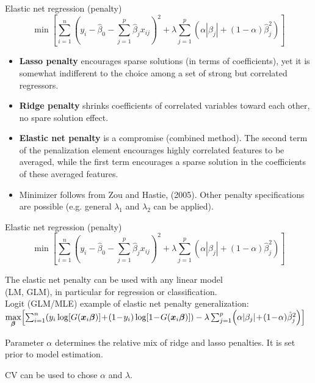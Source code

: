 \documentclass{beamer}
\begin{document}
\begin{frame}{Elastic net regression (penalty)}
$$\min \left[ \sum_{i=1}^n \left(y_i - \hat{\beta}_0 
         - \sum_{j=1}^p  \hat{\beta}_j x_{ij} \right)^2 
         \! + \lambda \sum_{j=1}^p 
         \left( \alpha |\beta_j| + (1-\alpha) \hat{\beta}_j^2 \right) \right]
$$
\small
\begin{itemize}
\item \textbf{Lasso penalty} encourages sparse solutions (in terms of coefficients), yet it is somewhat indifferent to the choice among a set of strong but correlated regressors.
\smallskip
\item \textbf{Ridge penalty} shrinks coefficients of correlated variables toward each other, no spare solution effect.
\smallskip
\item \textbf{Elastic net penalty} is a compromise (combined method). The second term of the penalization element encourages highly correlated features to be averaged, while
the first term encourages a sparse solution in the coefficients of these averaged features.
\item Minimizer follows from Zou and Hastie, (2005). Other penalty specifications are possible (e.g. general $\lambda_1$ and $\lambda_2$ can be applied).
\end{itemize}
\end{frame}
\begin{frame}{Elastic net regression (penalty)}
$$\min \left[ \sum_{i=1}^n \left(y_i - \hat{\beta}_0 
         - \sum_{j=1}^p  \hat{\beta}_j x_{ij} \right)^2 
         \! + \lambda \sum_{j=1}^p 
         \left( \alpha |\beta_j| + (1-\alpha) \hat{\beta}_j^2 \right) \right]
$$
\begin{itemize}
\item The elastic net penalty can be used with any linear model \\(LM, GLM), in particular for regression or classification.\\
Logit (GLM/MLE) example of elastic net penalty generalization:\\
\footnotesize{$\underset{\bm{\beta}}{\textnormal{max}}\!
\left[
\sum_{i=1}^n \!\left( y_i \log [G(\bm{x}_i\bm{\beta})] \!+\! 
(1\!-\!y_i) \log [1\!-\!G(\bm{x}_i\bm{\beta})]
\right)
- \lambda \sum_{j=1}^p \!\left( \alpha |\beta_j|\!+\!(1\!-\!\alpha) \hat{\beta}_j^2 \right)
\right]$}
\smallskip
\normalsize{
\item Parameter $\alpha$ determines the relative mix of ridge and lasso penalties. It is set prior to model estimation.
\medskip
\item CV can be used to chose $\alpha$ and $\lambda$.}
\end{itemize}
\end{frame}
\end{document}
